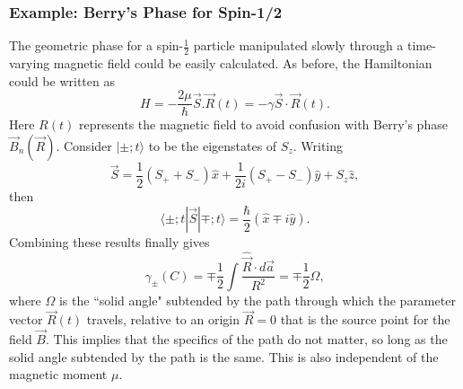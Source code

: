 \subsubsection{Example: Berry's Phase for Spin-1/2}
The geometric phase for a spin-$\frac{1}{2}$ particle manipulated
slowly through a time-varying magnetic field could be easily
calculated. As before, the Hamiltonian could be written as
%
\begin{equation}
H= - \frac{2 \mu}{\hbar} \vec{S}.\vec{R}(t)=-\gamma \vec{S} \cdot \vec{R}(t) .
\end{equation}
%
Here $R(t)$ represents the magnetic field to avoid confusion with Berry's
phase $\vec{B}_n(\vec{R})$.  Consider $|\pm ; t \rangle$ to be
the eigenstates of $S_z$. Writing
%
\begin{equation}
\vec{S}= \frac{1}{2} (S_++S_-)\hat{x}+\frac{1}{2i} (S_+-S_-) \hat{y} +S_z \hat{z} ,
\end{equation}
%
then
%
\begin{equation}
\langle \pm ; t|\vec{S}|\mp;t \rangle = \frac{\hbar}{2} (\hat{x} \mp i \hat{y}).
\end{equation}
%
Combining these results finally gives
%
\begin{equation}
\gamma_{\pm} (C)= \mp \frac{1}{2} \int \frac{\hat{\vec{R}}\cdot d\vec{a}}{R^2}=\mp \frac{1}{2} \Omega,
\end{equation}
%
where $\Omega$ is the ``solid angle" subtended by the path through
which the parameter vector $\vec{R}(t)$ travels, relative to an origin
$\vec{R}=0$ that is the source point for the field $\vec{B}$.  This
implies that the specifics of the path do not matter, so long as the
solid angle subtended by the path is the same. This is also
independent of the magnetic moment $\mu$.
